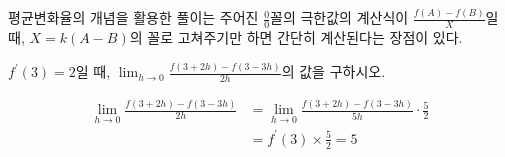 \documentclass[11pt, a4paper]{book}
\begin{document}
평균변화율의 개념을 활용한 풀이는 주어진 $\frac{0}{0}$꼴의 극한값의 계산식이 $\frac{f(A)-f(B)}{X}$일 때, $X = k(A-B)$의 꼴로 고쳐주기만 하면 간단히 계산된다는 장점이 있다.
\vspace{1em}
\begin{example}
	$f^{\prime}(3)=2$일 때, $\displaystyle\lim_{h\to 0}\frac{f(3 +2h)-f(3-3h)}{2h}$의 값을 구하시오.
	\begin{solution}
		\begin{align*}
		 \lim_{h\to 0}\frac{f(3 +2h)-f(3-3h)}{2h} &=\displaystyle\lim_{h\to 0}\frac{f(3+2h)-f(3-3h)}{5h}\cdot\frac{5}{2}\\
		 &=f^{\prime}(3)\times\frac{5}{2}=5
		\end{align*}
	\end{solution}
\end{example}
\vspace{1em}
\end{document}

